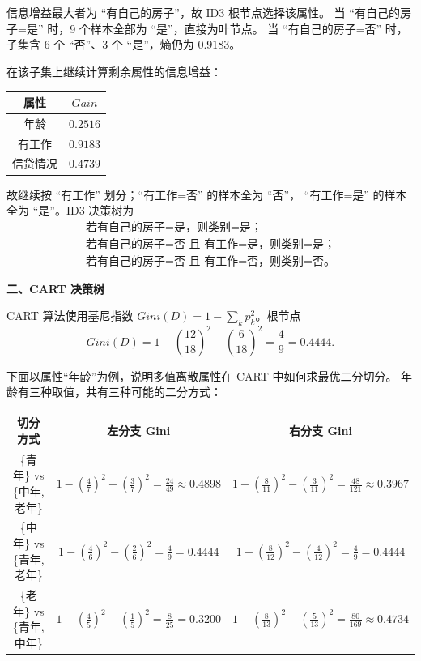 \documentclass[a4, 10pt, comentarios]{aleph-notas}
\begin{document}
信息增益最大者为 ``有自己的房子''，故 ID3 根节点选择该属性。
当 ``有自己的房子=是'' 时，9 个样本全部为 ``是''，直接为叶节点。
当 ``有自己的房子=否'' 时，子集含 6 个 ``否''、3 个 ``是''，熵仍为 $0.9183$。

在该子集上继续计算剩余属性的信息增益：

\begin{center}
\begin{tabular}{cc}
\toprule
属性 & $Gain$\\
\midrule
年龄   & $0.2516$\\
有工作 & $0.9183$\\
信贷情况 & $0.4739$\\
\bottomrule
\end{tabular}
\end{center}

故继续按 ``有工作'' 划分；``有工作=否'' 的样本全为 ``否''，
``有工作=是'' 的样本全为 ``是''。ID3 决策树为
\[
\begin{array}{l}
\text{若有自己的房子=是，则类别=是；}\\
\text{若有自己的房子=否 且 有工作=是，则类别=是；}\\
\text{若有自己的房子=否 且 有工作=否，则类别=否。}
\end{array}
\]

\textbf{二、CART 决策树}

CART 算法使用基尼指数 $Gini(D)=1-\sum_k p_k^2$。根节点
\[
    Gini(D)=1-\left(\frac{12}{18}\right)^{ 2}
              -\left(\frac{6}{18}\right)^{ 2}
           =\frac{4}{9}=0.4444 .
\]

下面以属性“年龄”为例，说明多值离散属性在 CART 中如何求最优二分切分。
年龄有三种取值，共有三种可能的二分方式：

\begin{center}
\begin{tabular}{ccc}
\toprule
切分方式 & 左分支 Gini & 右分支 Gini\\
\midrule
\{青年\} vs \{中年, 老年\}
    & $1-(\frac{4}{7})^{2}-(\frac{3}{7})^{2}=\frac{24}{49}\approx0.4898$
    & $1-(\frac{8}{11})^{2}-(\frac{3}{11})^{2}=\frac{48}{121}\approx0.3967$ \\[6pt]
\{中年\} vs \{青年, 老年\}
    & $1-(\frac{4}{6})^{2}-(\frac{2}{6})^{2}=\frac{4}{9}=0.4444$
    & $1-(\frac{8}{12})^{2}-(\frac{4}{12})^{2}=\frac{4}{9}=0.4444$ \\[6pt]
\{老年\} vs \{青年, 中年\}
    & $1-(\frac{4}{5})^{2}-(\frac{1}{5})^{2}=\frac{8}{25}=0.3200$
    & $1-(\frac{8}{13})^{2}-(\frac{5}{13})^{2}=\frac{80}{169}\approx0.4734$ \\
\bottomrule
\end{tabular}
\end{center}
\end{document}
